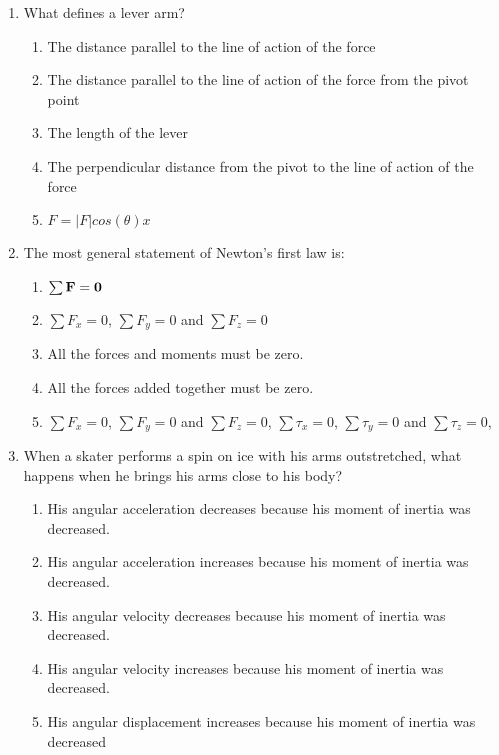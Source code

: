 \documentclass{../../../oss-apphys}
\begin{document}
\genheader


\genmultidirections

\gengravity

\raggedcolumns
\begin{multicols}{2}
  \begin{enumerate}[leftmargin=18pt]

  \item What defines a lever arm?
    \begin{enumerate}[nosep,leftmargin=18pt,label=(\Alph*)]
    \item The distance parallel to the line of action of the force
    \item The distance parallel to the line of action of the force from the
      pivot point
    \item The length of the lever
    \item The perpendicular distance from the pivot to the line of action of
      the force
    \item $F = |F|cos(\theta)x$
    \end{enumerate}
    \vspace{.7in}
    
  \item The most general statement of Newton's first law is:
    \begin{enumerate}[nosep,leftmargin=18pt,label=(\Alph*)]
    \item $\sum\mathbf{F}=\mathbf{0}$
    \item $\sum F_x=0$, $\sum F_y=0$ and $\sum F_z=0$
    \item All the forces and moments must be zero.
    \item All the forces added together must be zero.
    \item $\sum F_x=0$, $\sum F_y=0$ and $\sum F_z=0$, $\sum\tau_x=0$,
      $\sum\tau_y=0$ and $\sum\tau_z=0$,
    \end{enumerate}
    \vspace{.7in}
    
  \item When a skater performs a spin on ice with his arms outstretched, what
    happens when he brings his arms close to his body?
    \begin{enumerate}[nosep,leftmargin=18pt,label=(\Alph*)]
    \item His angular acceleration decreases because his moment of inertia
      was decreased.
    \item His angular acceleration increases because his moment of inertia
      was decreased.
    \item His angular velocity decreases because his moment of inertia was
      decreased.
    \item His angular velocity increases because his moment of inertia was
      decreased.
    \item His angular displacement increases because his moment of inertia
      was decreased
    \end{enumerate}
    \columnbreak
    

\end{enumerate}
\end{multicols}
\end{document}
